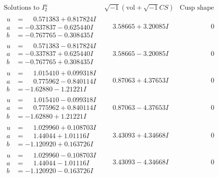 \documentclass[1p]{elsarticle_modified}
\theoremstyle{definition}
\newcommand{\I}{\sqrt{-1}}
\begin{document}
$$\begin{array}{c|c|c}  
\text{Solutions to }I^u_{2}& \I (\text{vol} + \sqrt{-1}CS) & \text{Cusp shape}\\
 \hline 
\begin{aligned}
u &= \phantom{-}0.571383 + 0.817824 I \\
a &= -0.337837 - 0.625440 I \\
b &= -0.767765 - 0.308435 I\end{aligned}
 & \phantom{-}3.58665 + 3.20085 I & \phantom{-0.000000 } 0 \\ \hline\begin{aligned}
u &= \phantom{-}0.571383 - 0.817824 I \\
a &= -0.337837 + 0.625440 I \\
b &= -0.767765 + 0.308435 I\end{aligned}
 & \phantom{-}3.58665 - 3.20085 I & \phantom{-0.000000 } 0 \\ \hline\begin{aligned}
u &= \phantom{-}1.015410 + 0.099318 I \\
a &= \phantom{-}0.775962 - 0.840114 I \\
b &= -1.62880 - 1.21221 I\end{aligned}
 & \phantom{-}0.87063 + 4.37653 I & \phantom{-0.000000 } 0 \\ \hline\begin{aligned}
u &= \phantom{-}1.015410 - 0.099318 I \\
a &= \phantom{-}0.775962 + 0.840114 I \\
b &= -1.62880 + 1.21221 I\end{aligned}
 & \phantom{-}0.87063 - 4.37653 I & \phantom{-0.000000 } 0 \\ \hline\begin{aligned}
u &= \phantom{-}1.029960 + 0.108703 I \\
a &= \phantom{-}1.44044 + 1.01116 I \\
b &= -1.120920 + 0.163726 I\end{aligned}
 & \phantom{-}3.43093 + 4.34668 I & \phantom{-0.000000 } 0 \\ \hline\begin{aligned}
u &= \phantom{-}1.029960 - 0.108703 I \\
a &= \phantom{-}1.44044 - 1.01116 I \\
b &= -1.120920 - 0.163726 I\end{aligned}
 & \phantom{-}3.43093 - 4.34668 I & \phantom{-0.000000 } 0 \\ \hline\begin{aligned}

\end{aligned}
\end{array}$$
\end{document}
